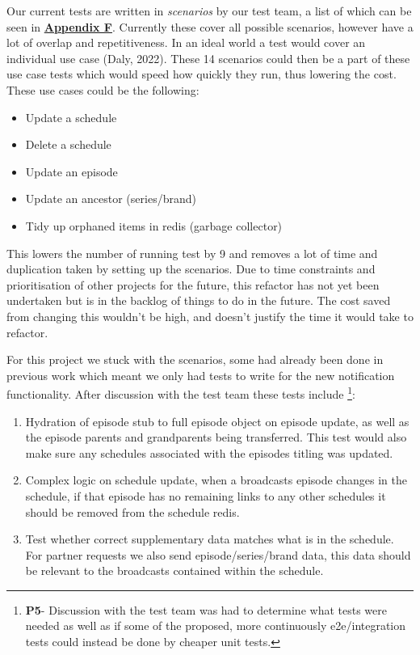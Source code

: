   Our current tests are written in \textit{scenarios} by our test team, a list of which can be seen in \hyperref[sec:AppendixF]{\textbf{Appendix F}}.
  Currently these cover all possible scenarios, however have a lot of overlap and repetitiveness. In an ideal world a test would cover an individual
  use case (Daly, 2022). These 14 scenarios could then be a part of these use case tests which would speed how quickly they run, thus lowering the cost.
  These use cases could be the following:

  \begin{itemize}
    \item Update a schedule
    \item Delete a schedule
    \item Update an episode
    \item Update an ancestor (series/brand)
    \item Tidy up orphaned items in redis (garbage collector)
  \end{itemize}

  This lowers the number of running test by 9 and removes a lot of time and duplication taken by setting up the scenarios. Due to time constraints and 
  prioritisation of other projects for the future, this refactor has not yet been undertaken but is in the backlog of things to do in the future. The 
  cost saved from changing this wouldn't be high, and doesn't justify the time it would take to refactor.

  For this project we stuck with the scenarios, some had already been done in previous work which meant we only had tests to write for the new 
  notification functionality. After discussion with the test team these tests include
  \footnote{\textbf{P5}- Discussion with the test team was had to determine what tests were needed as well as if some of the proposed, more continuously
  e2e/integration tests could instead be done by cheaper unit tests.}:

  \begin{enumerate}
    \item Hydration of episode stub to full episode object on episode update, as well as the episode parents and grandparents being transferred. This
    test would also make sure any schedules associated with the episodes titling was updated.
    \item Complex logic on schedule update, when a broadcasts episode changes in the schedule, if that episode has no remaining links to any other 
    schedules it should be removed from the schedule redis.
    \item Test whether correct supplementary data matches what is in the schedule. For partner requests we also send episode/series/brand data, 
    this data should be relevant to the broadcasts contained within the schedule.
  \end{enumerate}

